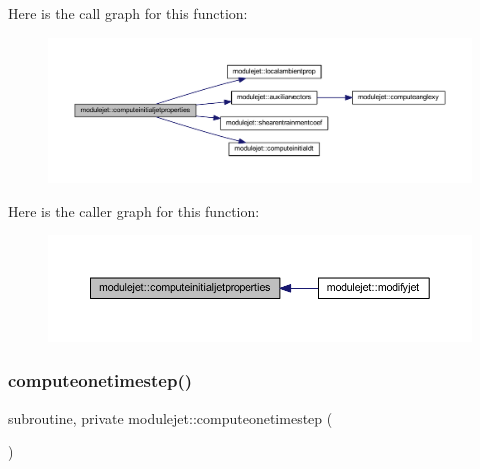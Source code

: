 Here is the call graph for this function\+:\nopagebreak
\begin{figure}[H]
\begin{center}
\leavevmode
\includegraphics[width=350pt]{namespacemodulejet_a8b1ef801e649c2313fee9754d2aeb58a_cgraph}
\end{center}
\end{figure}
Here is the caller graph for this function\+:\nopagebreak
\begin{figure}[H]
\begin{center}
\leavevmode
\includegraphics[width=350pt]{namespacemodulejet_a8b1ef801e649c2313fee9754d2aeb58a_icgraph}
\end{center}
\end{figure}
\mbox{\label{namespacemodulejet_aa7fe235d6b33c696f614897ed43a1e19}} 
\subsubsection{\texorpdfstring{computeonetimestep()}{computeonetimestep()}}
{\footnotesize\ttfamily subroutine, private modulejet\+::computeonetimestep (\begin{DoxyParamCaption}{ }\end{DoxyParamCaption})\hspace{0.3cm}{\ttfamily [private]}}

